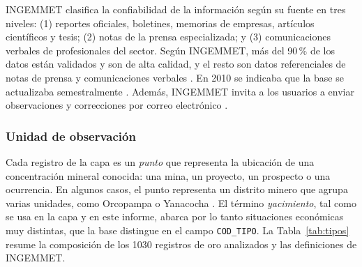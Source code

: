 \documentclass[man,12pt,a4paper,floatsintext,donotrepeattitle]{apa7}
\begin{document}
INGEMMET clasifica la confiabilidad de la información según su fuente en tres
niveles: (1) reportes oficiales, boletines, memorias de empresas, artículos
científicos y tesis; (2) notas de la prensa especializada; y (3) comunicaciones
verbales de profesionales del sector. Según INGEMMET, más del 90\,\% de los
datos están validados y son de alta calidad, y el resto son datos referenciales
de notas de prensa y comunicaciones verbales \parencite{ingemmet2026servicio}. En 2010 se indicaba que la base se
actualizaba semestralmente \parencite{huanacuni2010cpg}. Además, INGEMMET invita a
los usuarios a enviar observaciones y correcciones por correo electrónico
\parencite{huanacuni2010guia}.

\subsubsection{Unidad de observación}

Cada registro de la capa es un \textit{punto} que representa la ubicación de una
concentración mineral conocida: una mina, un proyecto, un prospecto o una
ocurrencia. En algunos casos, el punto representa un distrito minero que agrupa
varias unidades, como Orcopampa o Yanacocha \parencite{ingemmet2026servicio}. El
término \textit{yacimiento}, tal como se usa en la capa y en este informe,
abarca por lo tanto situaciones económicas muy distintas, que la base distingue
en el campo \texttt{COD\_TIPO}. La Tabla~\ref{tab:tipos} resume la composición de
los 1030 registros de oro analizados y las definiciones de INGEMMET.
\end{document}
